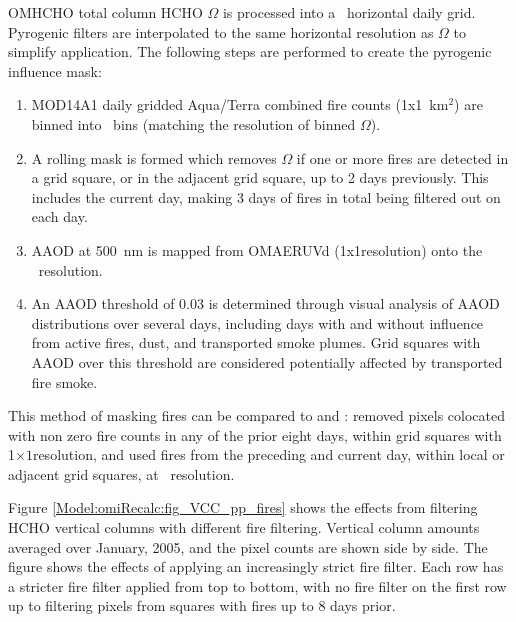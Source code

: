     OMHCHO total column HCHO $\Omega$ is processed into a \highhr ~horizontal daily grid.
    Pyrogenic filters are interpolated to the same horizontal resolution as $\Omega$ to simplify application. 
    The following steps are performed to create the pyrogenic influence mask:
    \begin{enumerate}
      \item MOD14A1 daily gridded Aqua/Terra combined fire counts (1x1~km$^2$) are binned into \highhr ~bins (matching the resolution of binned $\Omega$).
      \item A rolling mask is formed which removes $\Omega$ if one or more fires are detected in a grid square, or in the adjacent grid square, up to 2 days previously.
      This includes the current day, making 3 days of fires in total being filtered out on each day.
      \item AAOD at 500~nm is mapped from OMAERUVd (1x1\degr resolution) onto the \highhr ~resolution.
      \item An AAOD threshold of 0.03 is determined through visual analysis of AAOD distributions over several days, including days with and without influence from active fires, dust, and transported smoke plumes. 
      Grid squares with AAOD over this threshold are considered potentially affected by transported fire smoke.
    \end{enumerate}
    This method of masking fires can be compared to \textcite{Marais2012} and \textcite{Barkley2013}:
    \textcite{Marais2012} removed pixels colocated with non zero fire counts in any of the prior eight days, within grid squares with 1\degr$\times 1$\degr resolution, and \textcite{Barkley2013} used fires from the preceding and current day, within local or adjacent grid squares, at \highhr ~resolution.
    
    
    Figure \ref{Model:omiRecalc:fig_VCC_pp_fires} shows the effects from filtering HCHO vertical columns with different fire filtering.
    Vertical column amounts averaged over January, 2005, and the pixel counts are shown side by side.
    The figure shows the effects of applying an increasingly strict fire filter.
    Each row has a stricter fire filter applied from top to bottom, with no fire filter on the first row up to filtering pixels from squares with fires up to 8 days prior.
    
